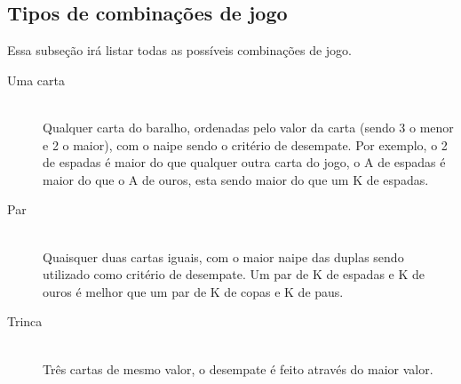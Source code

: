 \documentclass[12pt]{article}
\begin{document}
\subsection{Tipos de combinações de jogo}
\vspace{0.2 true cm}

Essa subseção irá listar todas as possíveis combinações de jogo.

\begin{description}

\item[Uma carta] \hfill \\
 Qualquer carta do baralho, ordenadas pelo valor da carta (sendo 3 o menor e 2 o maior), com o naipe sendo o critério de desempate. Por exemplo, o 2 de espadas é maior do que qualquer outra carta do jogo, o A de espadas é maior do que o A de ouros, esta sendo maior do que um K de espadas.

\vspace{0.4 true cm}

\item[Par] \hfill \\
 Quaisquer duas cartas iguais, com o maior naipe das duplas sendo utilizado como critério de desempate. Um par de K de espadas e K de ouros é melhor que um par de K de copas e K de paus.

\vspace{0.4 true cm}

\item[Trinca] \hfill \\
 Três cartas de mesmo valor, o desempate é feito através do maior valor.

\vspace{0.4 true cm}


\end{description}
\end{document}

